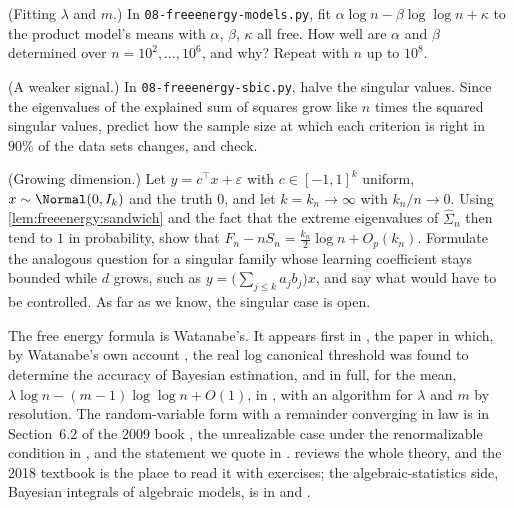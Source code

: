 \begin{refsection}
\begin{exercises}
\item \measurement (Fitting $\lambda$ and $m$.) In \texttt{08-freeenergy-models.py}, fit $\alpha\log n-\beta\log\log n+\kappa$ to the product model's means with $\alpha$, $\beta$, $\kappa$ all free. How well are $\alpha$ and $\beta$ determined over $n=10^2,\dots,10^6$, and why? Repeat with $n$ up to $10^8$.\label{ex:freeenergy:fitm}

\item \measurement (A weaker signal.) In \texttt{08-freeenergy-sbic.py}, halve the singular values. Since the eigenvalues of the explained sum of squares grow like $n$ times the squared singular values, predict how the sample size at which each criterion is right in $90\%$ of the data sets changes, and check.\label{ex:freeenergy:weaker}

\item \research (Growing dimension.) Let $y=c^\top x+\varepsilon$ with $c\in[-1,1]^{k}$ uniform, $x\sim\Normal(0,I_k)$ and the truth $0$, and let $k=k_n\to\infty$ with $k_n/n\to0$. Using \cref{lem:freeenergy:sandwich} and the fact that the extreme eigenvalues of $\hat\Sigma_n$ then tend to $1$ in probability, show that $F_n-nS_n=\frac{k_n}2\log n+O_p(k_n)$. Formulate the analogous question for a singular family whose learning coefficient stays bounded while $d$ grows, such as $y=\bigl(\sum_{j\le k}a_jb_j\bigr)x$, and say what would have to be controlled. As far as we know, the singular case is open.\label{ex:freeenergy:growing}
\end{exercises}

\notesandrefs
The free energy formula is Watanabe's. It appears first in \textcite{Watanabe1999}, the paper in which, by Watanabe's own account \parencite{Watanabe2024}, the real log canonical threshold was found to determine the accuracy of Bayesian estimation, and in full, for the mean, $\lambda\log n-(m-1)\log\log n+O(1)$, in \textcite{Watanabe2001a}, with an algorithm for $\lambda$ and $m$ by resolution. The random-variable form with a remainder converging in law is in Section~6.2 of the 2009 book \parencite{Watanabe2009}, the unrealizable case under the renormalizable condition in \textcite{Watanabe2010d}, and the statement we quote in \textcite{Watanabe2013}. \Textcite{Watanabe2024} reviews the whole theory, and the 2018 textbook \parencite{Watanabe2018} is the place to read it with exercises; the algebraic-statistics side, Bayesian integrals of algebraic models, is in \textcite[Chapter~5]{DrtonEtAl2009} and \textcite{Lin2011}.


\end{refsection}
